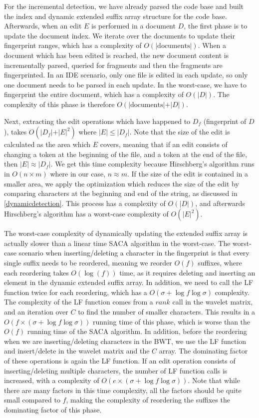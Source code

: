 For the incremental detection, we have already parsed the code base and built the index
and dynamic extended suffix array structure for the code base. Afterwards, when an edit
$E$ is performed in a document $D$, the first phase is to update the document index. We
iterate over the documents to update their fingerprint ranges, which has a complexity of
$O(\vert\text{documents}\vert)$. When a document which has been edited is reached, the new
document content is incrementally parsed, queried for fragments and then the fragments are
fingerprinted. In an IDE scenario, only one file is edited in each update, so only one
document needs to be parsed in each update. In the worst-case, we have to fingerprint the
entire document, which has a complexity of $O(\vert D\vert)$. The complexity of this phase
is therefore $O(\vert\text{documents}\vert + \vert D\vert)$.

Next, extracting the edit operations which have happened to $D_f$ (fingerprint of $D$),
takes $O(\vert D_f\vert + \vert E\vert^2)$ where $\vert E\vert \leq \vert D_f\vert$. Note
that the size of the edit is calculated as the area which $E$ covers, meaning that if an
edit consists of changing a token at the beginning of the file, and a token at the end of
the file, then $\vert E\vert \approx \vert D_f\vert$. We get this time complexity because
Hirschberg's algorithm runs in $O(n \times m)$ where in our case, $n \approx m$. If the
size of the edit is contained in a smaller area, we apply the optimization which reduces
the size of the edit by comparing characters at the beginning and end of the string, as
discussed in \cref{dynamicdetection}. This process has a complexity of $O(\vert D\vert)$,
and afterwards Hirschberg's algorithm has a worst-case complexity of $O(\vert E\vert^2)$.

The worst-case complexity of dynamically updating the extended suffix array is actually
slower than a linear time SACA algorithm in the worst-case. The worst-case scenario when
inserting/deleting a character in the fingerprint is that every single suffix needs to be
reordered, meaning we reorder $O(f)$ suffixes, where each reordering takes $O(\log(f))$
time, as it requires deleting and inserting an element in the dynamic extended suffix
array. In addition, we need to call the LF function twice for each reordering, which has a
$O(\sigma + \log f \log\sigma)$ complexity. The complexity of the LF function comes from a
$rank$ call in the wavelet matrix, and an iteration over $C$ to find the number of smaller
characters. This results in a $O(f \times (\sigma + \log f \log\sigma))$ running time of
this phase, which is worse than the $O(f)$ running time of the SACA algorithm. In
addition, before the reordering when we are inserting/deleting characters in the BWT, we
use the LF function and insert/delete in the wavelet matrix and the $C$ array. The
dominating factor of these operations is again the LF function. If an edit operation
consists of inserting/deleting multiple characters, the number of LF function calls is
increased, with a complexity of $O(e \times (\sigma + \log f \log\sigma))$. Note that
while there are many factors in this time complexity, all the factors should be quite
small compared to $f$, making the complexity of reordering the suffixes the dominating
factor of this phase.

